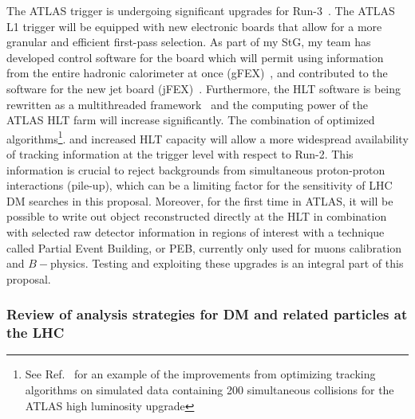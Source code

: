 The ATLAS trigger is undergoing significant upgrades for Run-3~\cite{Aad:1602235}. 
The ATLAS L1 trigger will be equipped with new electronic boards that allow for a more granular and efficient first-pass selection. 
As part of my StG, my team has developed control software for the board which will permit using information from the entire hadronic calorimeter at once (gFEX)~\cite{Tang:2016ded}, 
and contributed to the software for the new jet board (jFEX)~\cite{Bauss:2018nde}. 
Furthermore, the HLT software is being rewritten as a multithreaded framework~\cite{Bielski:2674286} and the computing power of the ATLAS HLT farm will increase significantly. 
The combination of optimized algorithms\footnote{See Ref.~\cite{ATL-PHYS-PUB-2019-041} %
for an example of the improvements from optimizing tracking algorithms on simulated data containing 200 simultaneous collisions for the ATLAS high luminosity upgrade}. 
and increased HLT capacity will allow a more widespread availability of tracking information at the trigger level with respect to Run-2. 
This information is crucial to reject backgrounds from simultaneous proton-proton interactions (pile-up), which can be a limiting factor for the sensitivity of LHC DM searches in this proposal. 
Moreover, for the first time in ATLAS, it will be possible to write out object reconstructed directly at the HLT in combination with selected raw detector information in regions of interest with a technique called Partial Event Building, or PEB, currently only used for muons calibration and $B-$physics. 
Testing and exploiting these upgrades is an integral part of this proposal. 


\subsubsection{Review of analysis strategies for DM and related particles at the LHC}

